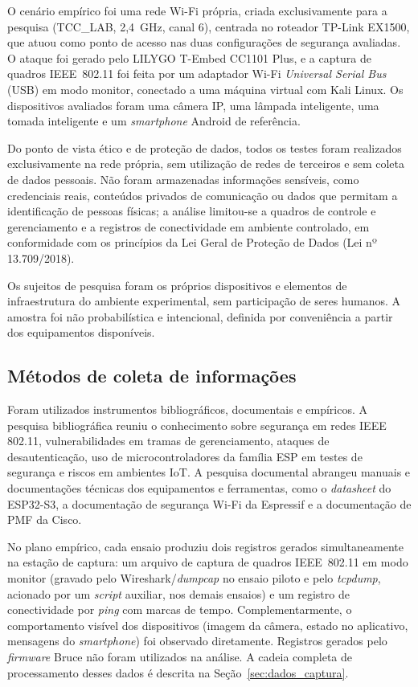 O cenário empírico foi uma rede Wi-Fi própria, criada exclusivamente para a pesquisa (TCC\_LAB, 2,4~GHz, canal 6), centrada no roteador TP\mbox{-}Link EX1500, que atuou como ponto de acesso nas duas configurações de segurança avaliadas. O ataque foi gerado pelo LILYGO T\mbox{-}Embed CC1101 Plus, e a captura de quadros IEEE~802.11 foi feita por um adaptador Wi-Fi \textit{Universal Serial Bus} (USB) em modo monitor, conectado a uma máquina virtual com Kali Linux. Os dispositivos avaliados foram uma câmera IP, uma lâmpada inteligente, uma tomada inteligente e um \textit{smartphone} Android de referência.

Do ponto de vista ético e de proteção de dados, todos os testes foram
realizados exclusivamente na rede própria, sem utilização de redes de
terceiros e sem coleta de dados pessoais. Não foram armazenadas
informações sensíveis, como credenciais reais, conteúdos privados de
comunicação ou dados que permitam a identificação de pessoas físicas;
a análise limitou-se a quadros de controle e gerenciamento e a registros
de conectividade em ambiente controlado, em conformidade com os princípios
da Lei Geral de Proteção de Dados (Lei nº 13.709/2018).

Os sujeitos de pesquisa foram os próprios dispositivos e elementos de infraestrutura do ambiente experimental, sem participação de seres humanos. A amostra foi não probabilística e intencional, definida por conveniência a partir dos equipamentos disponíveis.

\subsection{Métodos de coleta de informações}

Foram utilizados instrumentos bibliográficos, documentais e empíricos. A pesquisa bibliográfica reuniu o conhecimento sobre segurança em redes IEEE 802.11, vulnerabilidades em tramas de gerenciamento, ataques de desautenticação, uso de microcontroladores da família ESP em testes de segurança e riscos em ambientes IoT. A pesquisa documental abrangeu manuais e documentações técnicas dos equipamentos e ferramentas, como o \textit{datasheet} do ESP32-S3, a documentação de segurança Wi-Fi da Espressif e a documentação de PMF da Cisco.

No plano empírico, cada ensaio produziu dois registros gerados simultaneamente na estação de captura: um arquivo de captura de quadros IEEE~802.11 em modo monitor (gravado pelo Wireshark/\textit{dumpcap} no ensaio piloto e pelo \textit{tcpdump}, acionado por um \textit{script} auxiliar, nos demais ensaios) e um registro de conectividade por \textit{ping} com marcas de tempo. Complementarmente, o comportamento visível dos dispositivos (imagem da câmera, estado no aplicativo, mensagens do \textit{smartphone}) foi observado diretamente. Registros gerados pelo \textit{firmware} Bruce não foram utilizados na análise. A cadeia completa de processamento desses dados é descrita na Seção~\ref{sec:dados_captura}.

